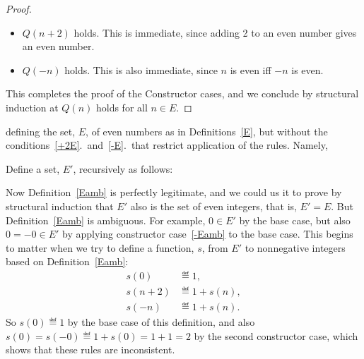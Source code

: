 \begin{definition}
\begin{staffnotes}
\begin{lemma*}
\begin{proof}
\begin{itemize}
\item $Q(n+2)$ holds.  This is immediate, since adding 2 to an even number
  gives an even number.

\item $Q(-n)$ holds.  This is also immediate, since $n$ is even iff $-n$ is
even.

\end{itemize}

This completes the proof of the Constructor cases, and we conclude by
structural induction at $Q(n)$ holds for all $n \in E$.
\end{proof}

\end{lemma*}


defining the set, $E$, of even numbers as in Definitions~\ref{E}, but
without the conditions~\ref{+2E}.\ and~\ref{-E}.\ that restrict application of
the rules.  Namely,

\begin{definition}\label{Eamb}
Define a set, $E'$, recursively as follows:
\end{definition}

Now Definition~\ref{Eamb} is perfectly legitimate, and we could us it to
prove by structural induction that $E'$ also is the set of even integers,
that is, $E'= E$.  But Definition~\ref{Eamb} is ambiguous.  For example,
$0\in E'$ by the base case, but also $0=-0 \in E'$ by applying constructor
case~\ref{-Eamb} to the base case.  This begins to matter when we try to
define a function, $s$, from $E'$ to nonnegative integers based on
Definition~\ref{Eamb}:
\begin{align*}
  s(0) & \eqdef 1,\\
s(n+2) & \eqdef 1+ s(n),\\
 s(-n) & \eqdef 1+ s(n).
\end{align*}
So $s(0) \eqdef 1$ by the base case of this definition, and also $s(0)=
s(-0) \eqdef 1+s(0) = 1 + 1 = 2$ by the second constructor case, which
shows that these rules are inconsistent.


\end{staffnotes}
\end{definition}

